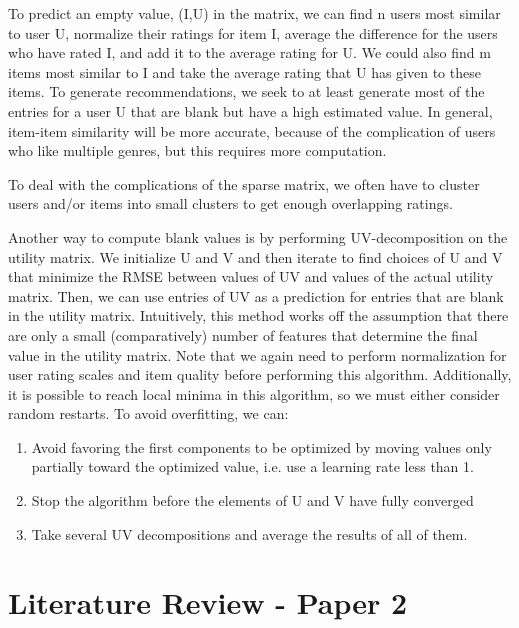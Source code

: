 \documentclass[11pt]{article}
\begin{document}
\par To predict an empty value, (I,U) in the matrix, we can find n users most similar to user U, normalize their ratings for item I, average the difference for the users who have rated I, and add it to the average rating for U. We could also find m items most similar to I and take the average rating that U has given to these items. To generate recommendations, we seek to at least generate most of the entries for a user U that are blank but have a high estimated value. In general, item-item similarity will be more accurate, because of the complication of users who like multiple genres, but this requires more computation. \\
\par To deal with the complications of the sparse matrix, we often have to cluster users and/or items into small clusters to get enough overlapping ratings. \\
\par Another way to compute blank values is by performing UV-decomposition on the utility matrix. We initialize U and V and then iterate to find choices of U and V that minimize the RMSE between values of UV and values of the actual utility matrix. Then, we can use entries of UV as a prediction for entries that are blank in the utility matrix. Intuitively, this method works off the assumption that there are only a small (comparatively) number of features that determine the final value in the utility matrix. Note that we again need to perform normalization for user rating scales and item quality before performing this algorithm. Additionally, it is possible to reach local minima in this algorithm, so we must either consider random restarts. To avoid overfitting, we can:
\begin{enumerate}
		\item Avoid favoring the first components to be optimized by moving values only partially toward the optimized value, i.e. use a learning rate less than 1.
		\item Stop the algorithm before the elements of U and V have fully converged
		\item Take several UV decompositions and average the results of all of them.
\end{enumerate}	



\section*{Literature Review - Paper 2}
\end{document}
